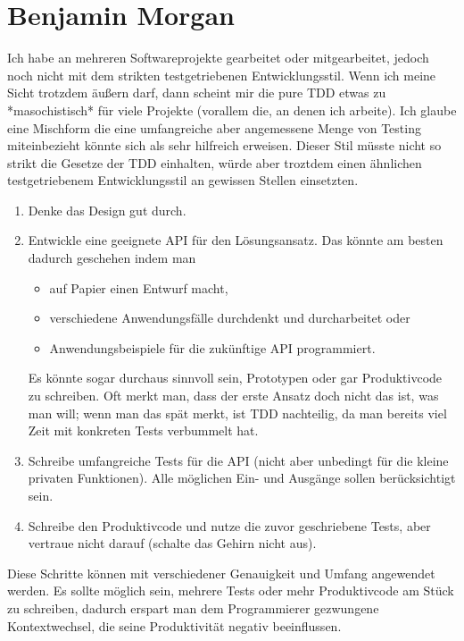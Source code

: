 \documentclass{mitschrift}
\newcommand{\bmn}{\marginpar{Benjamin\\Morgan}}
\begin{document}
\section{Benjamin Morgan}\label{Erfahrungsbericht Ben}\bmn
Ich habe an mehreren Softwareprojekte gearbeitet oder mitgearbeitet, jedoch
noch nicht mit dem strikten testgetriebenen Entwicklungsstil. Wenn ich meine
Sicht trotzdem äußern darf, dann scheint mir die pure TDD etwas zu
*masochistisch* für viele Projekte (vorallem die, an denen ich arbeite). Ich glaube
eine Mischform die eine umfangreiche aber angemessene Menge von Testing
miteinbezieht könnte sich als sehr hilfreich erweisen. Dieser Stil müsste
nicht so strikt die Gesetze der TDD einhalten, würde aber troztdem einen
ähnlichen testgetriebenem Entwicklungsstil an gewissen Stellen einsetzten.

\begin{enumerate}
    \item Denke das Design gut durch.
    \item Entwickle eine geeignete API für den Lösungsansatz. Das könnte am
        besten dadurch geschehen indem man
        \begin{itemize}
            \item auf Papier einen Entwurf macht,
            \item verschiedene Anwendungsfälle durchdenkt und durcharbeitet
                oder
            \item Anwendungsbeispiele für die zukünftige API programmiert.
        \end{itemize}
        Es könnte sogar durchaus sinnvoll sein, Prototypen oder gar
        Produktivcode zu schreiben. Oft merkt man, dass der erste Ansatz
        doch nicht das ist, was man will; wenn man das spät merkt, ist TDD
        nachteilig, da man bereits viel Zeit mit konkreten Tests verbummelt
        hat.
    \item Schreibe umfangreiche Tests für die API (nicht aber unbedingt für die
        kleine privaten Funktionen). Alle möglichen Ein- und Ausgänge sollen
        berücksichtigt sein.
    \item Schreibe den Produktivcode und nutze die zuvor geschriebene Tests,
        aber vertraue nicht darauf (schalte das Gehirn nicht aus).
\end{enumerate}

Diese Schritte können mit verschiedener Genauigkeit und Umfang angewendet
werden. Es sollte möglich sein, mehrere Tests oder mehr Produktivcode am
Stück zu schreiben, dadurch erspart man dem Programmierer gezwungene
Kontextwechsel, die seine Produktivität negativ beeinflussen.
\end{document}
